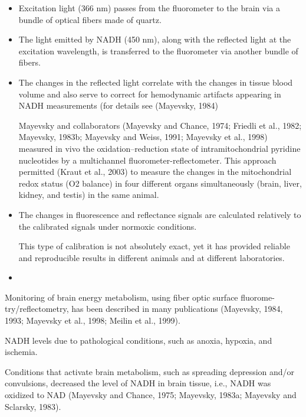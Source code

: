 \begin{itemize}
  
  \item   Excitation light (366 nm) passes from the fluorometer to the brain via
  a bundle of optical fibers made of quartz.
  
  \item   The light emitted by NADH (450 nm), along with the reflected light at
  the excitation wavelength, is transferred to the fluorometer via another
  bundle of fibers.
  
  \item The changes in the reflected light correlate with the changes in tissue
  blood volume and also serve to correct for hemodynamic artifacts appearing
  in NADH measurements (for details see (Mayevsky, 1984) 

Mayevsky and collaborators (Mayevsky and Chance, 1974; Friedli et al., 1982;
Mayevsky, 1983b; Mayevsky and Weiss, 1991; Mayevsky et al., 1998) measured in
vivo the oxidation–reduction state of intramitochondrial pyridine nucleotides by
a multichannel fluorometer-reflectometer. This approach permitted (Kraut et al.,
2003) to measure the changes in the mitochondrial redox status (O2 balance) in
four different organs simultaneously (brain, liver, kidney, and testis) in the
same animal.
  
  \item The changes in fluorescence and reflectance signals are calculated
  relatively to the calibrated signals under normoxic conditions.
  
  This type of calibration is not absolutely exact, yet it has provided reliable
  and reproducible results in different animals and at different laboratories.
    
  \item  
\end{itemize}



Monitoring of brain energy metabolism, using fiber optic surface fluorome-
try/reflectometry, has been described in many publications (Mayevsky, 1984,
1993; Mayevsky et al., 1998; Meilin et al., 1999).

NADH levels due to pathological conditions, such as anoxia, hypoxia, and ischemia.

Conditions that activate brain metabolism, such as spreading depression and/or
convulsions, decreased the level of NADH in brain tissue, i.e., NADH was
oxidized to NAD (Mayevsky and Chance, 1975; Mayevsky, 1983a; Mayevsky and
Sclarsky, 1983).



